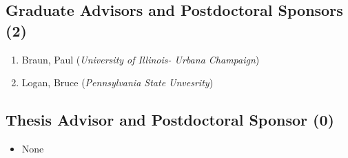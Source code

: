 \subsection*{Graduate Advisors and Postdoctoral Sponsors
(2)}\label{graduate-advisors-and-postdoctoral-sponsors-2}

\begin{enumerate}
\def\labelenumi{\arabic{enumi}.}
\itemsep1pt\parskip0pt
\item
  Braun, Paul (\emph{University of Illinois- Urbana Champaign})
\item
  Logan, Bruce (\emph{Pennsylvania State Unvesrity})
\end{enumerate}

\subsection*{Thesis Advisor and Postdoctoral Sponsor
(0)}\label{thesis-advisor-and-postdoctoral-sponsor-0}

\begin{itemize}
\itemsep1pt\parskip0pt
\item
  None
\end{itemize}